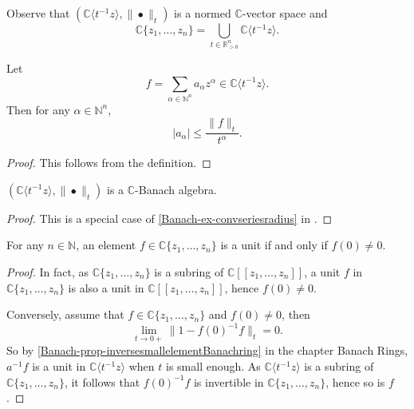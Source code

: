 Observe that $(\mathbb{C}\langle t^{-1}z\rangle ,\|\bullet\|_t)$ is a normed $\mathbb{C}$-vector space and
\begin{equation}\label{eq-convpowerseriesasunion}
    \mathbb{C}\{ z_1,\ldots,z_n\}=\bigcup_{t\in \mathbb{R}_{>0}^n}\mathbb{C}\langle t^{-1}z\rangle .
\end{equation}

\begin{proposition}
    Let 
    \[
        f=\sum_{\alpha\in \mathbb{N}^n} a_{\alpha}z^{\alpha}\in  \mathbb{C}\langle t^{-1}z\rangle. 
    \]
    Then for any $\alpha \in \mathbb{N}^n$,
    \[
      |a_{\alpha}|\leq  \frac{\|f\|_t}{t^{\alpha}}.
    \]
\end{proposition}
\begin{proof}
    This follows from the definition.
\end{proof}

\begin{proposition}\label{prop-CzztBanachalg}
    $(\mathbb{C}\langle t^{-1}z\rangle ,\|\bullet\|_t)$ is a $\mathbb{C}$-Banach algebra.
\end{proposition}
\begin{proof}
    This is a special case of \cref{Banach-ex-convseriesradius} in 
    .
\end{proof}


\begin{lemma}\label{lma-unitsinconvpowerseries}
    For any $n\in \mathbb{N}$, an element $f\in \mathbb{C}\{ z_1,\ldots,z_n \}$ is a unit if and only if $f(0)\neq 0$.
\end{lemma}
\begin{proof}
    In fact, as $\mathbb{C}\{ z_1,\ldots,z_n \}$ is a subring of $\mathbb{C}[[z_1,\ldots,z_n]]$, a unit $f$ in $\mathbb{C}\{ z_1,\ldots,z_n \}$ is also a unit in $\mathbb{C}[[z_1,\ldots,z_n]]$, hence $f(0)\neq 0$.

    Conversely, assume that $f\in \mathbb{C}\{ z_1,\ldots,z_n \}$ and $f(0)\neq 0$, then
    \[
        \lim_{t\to 0+}\|1-f(0)^{-1}f\|_t=0.
    \]
    So by \cref{Banach-prop-inversesmallelementBanachring} in the chapter Banach Rings, $a^{-1}f$ is a unit in $\mathbb{C}\langle t^{-1}z\rangle$ when $t$ is small enough. As $\mathbb{C}\langle t^{-1}z\rangle$ is a subring of $\mathbb{C}\{ z_1,\ldots,z_n \}$, it follows that $f(0)^{-1}f$ is invertible in $\mathbb{C}\{ z_1,\ldots,z_n \}$, hence so is $f$.
\end{proof}



